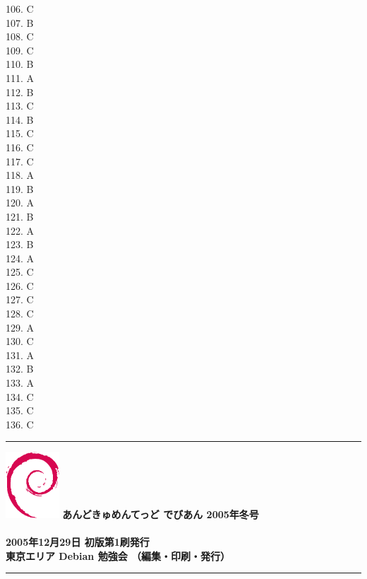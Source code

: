 \documentclass[mingoth,a4paper]{jsarticle}
\begin{document}
106. C\\
107. B\\
108. C\\
109. C\\
110. B\\
111. A\\
112. B\\
113. C\\
114. B\\
115. C\\
116. C\\
117. C\\
118. A\\
119. B\\
120. A\\
121. B\\
122. A\\
123. B\\
124. A\\
125. C\\
126. C\\
127. C\\
128. C\\
129. A\\
130. C\\
131. A\\
132. B\\
133. A\\
134. C\\
135. C\\
136. C\\

\onecolumn
\newpage

\vspace*{15cm}
\hrule
\vspace{2mm}
\includegraphics[width=2cm]{image200502/openlogo-nd.eps}
\noindent \Large \bf あんどきゅめんてっど でびあん 2005年冬号\\ \\
\noindent \normalfont 2005年12月29日 \hspace{5mm}  初版第1刷発行\\
\noindent \normalfont 東京エリア Debian 勉強会 （編集・印刷・発行）\\
\hrule
\end{document}

